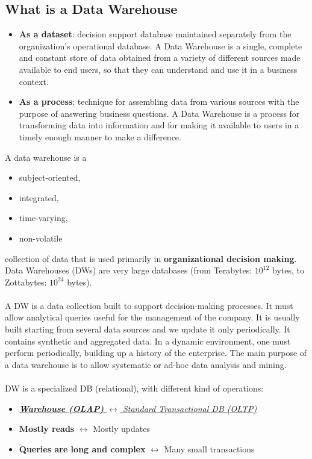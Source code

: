 \documentclass[10pt,a4paper]{article}
\newcommand{\nline}{\\~\\}
\begin{document}
\begin{justify}
\subsection{What is a Data Warehouse}
\begin{itemize}
	\item \textbf{As a dataset}: decision support database maintained separately from the organization’s operational database. A Data Warehouse is a single, complete and constant store of data obtained from a variety of different sources made available to end users, so that they can understand and use it in a business context.
	\item \textbf{As a process}: technique for assembling data from various sources with the purpose of answering business questions. A Data Warehouse is a process for transforming data into information and for making it available to users in a timely enough manner to make a difference.
\end{itemize}
A data warehouse is a
\begin{itemize}
	\item subject-oriented,
	\item integrated,
	\item time-varying,
	\item non-volatile
\end{itemize} 
collection of data that is used primarily in \textbf{organizational decision making}. \\
Data Warehouses (DWs) are very large databases (from Terabytes: $10^{12}$ bytes, to Zottabytes: $10^{24}$ bytes). \nline
A DW is a data collection built to support decision-making processes. It must allow analytical queries useful for the management of the company. It is usually built starting from several data sources and we update it only periodically. It contains synthetic and aggregated data. In a dynamic environment, one must perform periodically, building up a history of the enterprise. The main purpose of a data warehouse is to allow systematic or ad-hoc data analysis and mining. \nline
DW is a specialized DB (relational), with different kind of operations:
\begin{itemize}
	\item \uline{\textit{\textbf{Warehouse (OLAP)} $\leftrightarrow$ Standard Transactional DB (OLTP)}}
	\item \textbf{Mostly reads} $\leftrightarrow$ Mostly updates
	\item \textbf{Queries are long and complex} $\leftrightarrow$ Many small transactions

\end{itemize}
\end{justify}
\end{document}
